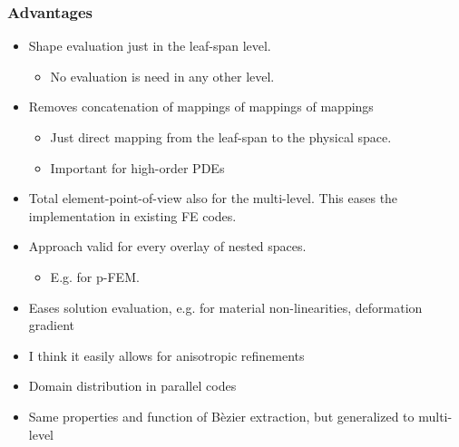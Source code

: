 \documentclass{beamer}
\begin{document}
\begin{frame}
	\frametitle{Advantages}

	\begin{itemize}
		\item Shape evaluation just in the leaf-span level.
			\begin{itemize}
				\item No evaluation is need in any other level.
			\end{itemize}
		\item Removes concatenation of mappings of mappings of mappings
			\begin{itemize}
				\item Just direct mapping from the leaf-span to the physical space.
				\item Important for high-order PDEs
			\end{itemize}
		\item Total element-point-of-view also for the multi-level. This eases the implementation in existing FE codes.
		\item Approach valid for every overlay of nested spaces.
			\begin{itemize}
				\item E.g. for p-FEM.
			\end{itemize} 
		\item Eases solution evaluation, e.g. for material non-linearities, deformation gradient		
		\item I think it easily allows for anisotropic refinements
		\item Domain distribution in parallel codes
		\item Same properties and function of B\`ezier extraction, but generalized to multi-level
		
	\end{itemize}
\end{frame}
\end{document}
